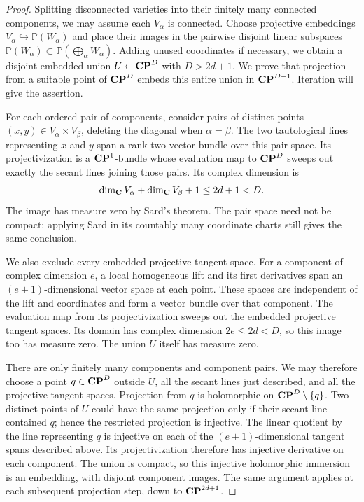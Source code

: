 \begin{proof}
Splitting disconnected varieties into their finitely many connected
components, we may assume each $V_\alpha$ is connected.
Choose projective embeddings $V_\alpha\hookrightarrow\mathbb P(W_\alpha)$
and place their images in the pairwise disjoint linear subspaces
$\mathbb P(W_\alpha)\subset\mathbb P(\bigoplus_\alpha W_\alpha)$.
Adding unused coordinates if necessary, we obtain a disjoint embedded
union $U\subset\mathbf{CP}^D$ with $D>2d+1$. We prove that projection from a
suitable point of $\mathbf{CP}^D$ embeds this entire union in $\mathbf{CP}^{D-1}$.
Iteration will give the assertion.

For each ordered pair of components, consider pairs of distinct points
$(x,y)\in V_\alpha\times V_\beta$, deleting the diagonal when
$\alpha=\beta$. The two tautological lines representing $x$ and $y$
span a rank-two vector bundle over this pair space. Its projectivization
is a $\mathbf{CP}^1$-bundle whose evaluation map to $\mathbf{CP}^D$ sweeps out exactly
the secant lines joining those pairs. Its complex dimension is
\[
 \dim_{\mathbf C}V_\alpha+\dim_{\mathbf C}V_\beta+1\leq2d+1<D.
\]
The image has measure zero by Sard's theorem. The pair space need not
be compact; applying Sard in its countably many coordinate charts
still gives the same conclusion.

We also exclude every embedded projective tangent space. For a
component of complex dimension $e$, a local homogeneous lift and its
first derivatives span an $(e+1)$-dimensional vector space at each
point. These spaces are independent of the lift and coordinates and
form a vector bundle over that component. The evaluation map from its
projectivization sweeps out the embedded projective tangent spaces.
Its domain has complex dimension $2e\leq2d<D$, so this image too has
measure zero. The union $U$ itself has measure zero.

There are only finitely many components and component pairs. We may
therefore choose a point $q\in\mathbf{CP}^D$ outside $U$, all the secant lines
just described, and all the projective tangent spaces. Projection from
$q$ is holomorphic on $\mathbf{CP}^D\setminus\{q\}$. Two distinct points of
$U$ could have the same projection only if their secant line contained
$q$; hence the restricted projection is injective. The linear quotient
by the line representing $q$ is injective on each of the
$(e+1)$-dimensional tangent spans described above. Its projectivization
therefore has injective derivative on each component. The union is
compact, so this injective
holomorphic immersion is an embedding, with disjoint component images.
The same argument applies at each subsequent projection step, down to
$\mathbf{CP}^{2d+1}$.
\end{proof}


